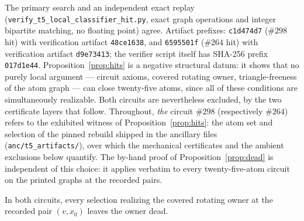 The primary search and an independent exact replay
(\texttt{verify\_t5\_local\_classifier\_hit.py}, exact graph
operations and integer bipartite matching, no floating point) agree.
Artifact prefixes: \texttt{c1d474d7} (\(\#298\) hit) with verification
artifact \texttt{48ce1638}, and \texttt{6595501f} (\(\#264\) hit) with
verification artifact \texttt{d9e73413}; the verifier script itself
has SHA-256 prefix \texttt{017d1e44}.
Proposition~\ref{prop:hits} is a negative structural datum: it shows
that no purely local argument --- circuit axioms, covered rotating
owner, triangle-freeness of the atom graph --- can close twenty-five
atoms, since all of these conditions are simultaneously realizable.
Both circuits are nevertheless excluded, by the two certificate layers
that follow. Throughout, \emph{the} circuit \(\#298\) (respectively
\(\#264\)) refers to the exhibited witness of
Proposition~\ref{prop:hits}: the atom set and selection of the pinned
rebuild shipped in the ancillary files
(\texttt{anc/t5\_artifacts/}), over which the mechanical certificates
and the ambient exclusions below quantify. The by-hand proof of
Proposition~\ref{prop:dead} is independent of this choice: it applies
verbatim to every twenty-five-atom circuit on the printed graphs at
the recorded pairs.

\begin{proposition}\label{prop:dead}
In both circuits, every selection realizing the covered rotating owner
at the recorded pair \((v,x_0)\) leaves the owner dead.
\end{proposition}


